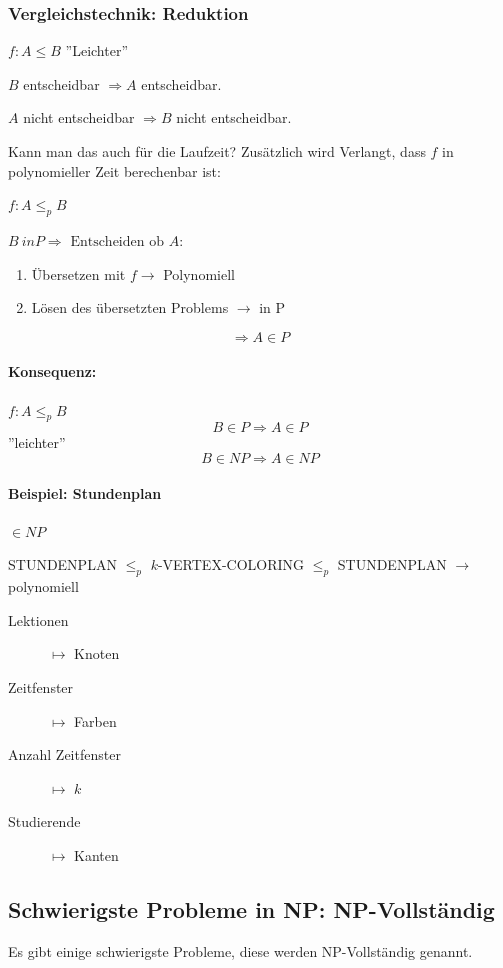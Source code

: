 \subsubsection{Vergleichstechnik: Reduktion}

$f: A \leq B$ ''Leichter''

$B$ entscheidbar $\Rightarrow A$ entscheidbar.

$A$ nicht entscheidbar $\Rightarrow B$ nicht entscheidbar.

Kann man das auch für die Laufzeit? Zusätzlich wird Verlangt, dass $f$ in polynomieller Zeit berechenbar ist:

$f: A \leq_p B$

$B \ in P \Rightarrow \text{ Entscheiden ob } A$:
\begin{enumerate}
	\item Übersetzen mit $f \rightarrow$ Polynomiell
	\item Lösen des übersetzten Problems $\rightarrow$ in P
\end{enumerate}
\[
	\Rightarrow A \in P
\]


\paragraph{Konsequenz:} $f: A \leq_p B$
\[
	B \in P \Rightarrow A \in P
\]
''leichter''
\[
	B \in NP \Rightarrow A \in NP
\]

\paragraph{Beispiel: Stundenplan} $\in NP$

STUNDENPLAN $\leq_p$ $k$-VERTEX-COLORING $\leq_p$ STUNDENPLAN $\longrightarrow$ polynomiell

\begin{description}
	\item[Lektionen] $\mapsto$ Knoten
	\item[Zeitfenster] $\mapsto$ Farben
	\item[Anzahl Zeitfenster] $\mapsto$ $k$
	\item[Studierende] $\mapsto$ Kanten
\end{description}


\subsection{Schwierigste Probleme in NP: NP-Vollständig}

Es gibt einige schwierigste Probleme, diese werden NP-Vollständig genannt.

